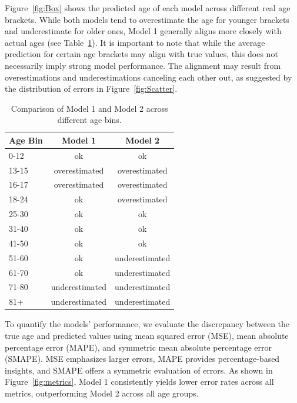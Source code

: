 \documentclass{article}
\begin{document}
Figure~\ref{fig:Box} shows the predicted age of each model across different real age brackets. While both models tend to overestimate the age for younger brackets and underestimate for older ones, Model 1 generally aligns more closely with actual ages (see Table~\ref{tab:bars}).
It is important to note that while the average prediction for certain age brackets may align with true values, this does not necessarily imply strong model performance. The alignment may result from overestimations and underestimations canceling each other out, as suggested by the distribution of errors in Figure~\ref{fig:Scatter}.

\begin{table}[h]
\centering
\begin{tabular}{l|c|c}
\textbf{Age Bin} & \textbf{Model 1} & \textbf{Model 2} \\ \hline
0-12    & ok              & ok              \\ 
13-15   & overestimated   & overestimated   \\ 
16-17   & overestimated   & overestimated   \\ 
18-24   & ok              & overestimated   \\ 
25-30   & ok              & ok              \\ 
31-40   & ok              & ok              \\ 
41-50   & ok              & ok              \\ 
51-60   & ok              & underestimated  \\ 
61-70   & ok              & underestimated  \\ 
71-80   & underestimated  & underestimated  \\ 
81+     & underestimated  & underestimated  \\ 
\end{tabular}
\caption{Comparison of Model 1 and Model 2 across different age bins.}
\label{tab:bars}
\end{table}

To quantify the models' performance, we evaluate the discrepancy between the true age and predicted values using mean squared error (MSE), mean absolute percentage error (MAPE), and symmetric mean absolute percentage error (SMAPE). MSE emphasizes larger errors, MAPE provides percentage-based insights, and SMAPE offers a symmetric evaluation of errors. As shown in Figure~\ref{fig:metrics}, Model 1 consistently yields lower error rates across all metrics, outperforming Model 2 across all age groups.
\end{document}
